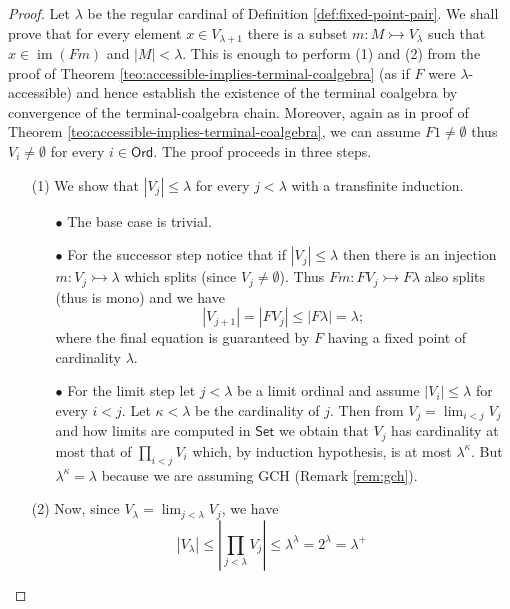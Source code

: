 \documentclass[letterpaper, 11pt, oneside]{memoir}
\theoremstyle{myteo}
\numberwithin{equation}{section}
\newcommand{\Ord}{\textsf{Ord}}
\newcommand{\Set}{\textsf{Set}}
\DeclareMathOperator{\im}{im}
\begin{document}
\begin{proof}
  Let \(\lambda\) be the regular cardinal of Definition \ref{def:fixed-point-pair}.
  We shall prove that for every element \(x \in V_{\lambda + 1}\) there is a subset \(m : M \rightarrowtail V_\lambda\) such that \(x \in \im(Fm)\) and \(|M| < \lambda\).
  This is enough to perform (1) and (2) from the proof of Theorem \ref{teo:accessible-implies-terminal-coalgebra} (as if \(F\) were \(\lambda\)-accessible) and hence establish the existence of the terminal coalgebra by convergence of the terminal-coalgebra chain.
  Moreover, again as in proof of Theorem \ref{teo:accessible-implies-terminal-coalgebra}, we can assume \(F1 \neq \emptyset\) thus \(V_i \neq \emptyset\) for every \(i \in \Ord\).
  The proof proceeds in three steps.
  \begin{itemize}
  \item[(1)]
    We show that \(|V_j| \leq \lambda\) for every \(j < \lambda\) with a transfinite induction.
    \begin{itemize}
    \item[\(\bullet\)] The base case is trivial.
    \item[\(\bullet\)] For the successor step notice  that if \(|V_j| \leq \lambda\) then there is an injection \(m : V_j \rightarrowtail \lambda\) which splits (since \(V_j \neq \emptyset\)).
      Thus \(Fm : FV_j \rightarrowtail F\lambda\) also splits (thus is mono) and we have
      \begin{equation*}
        |V_{j + 1}| = |FV_j| \leq |F\lambda| =\lambda;
      \end{equation*}
      where the final equation is guaranteed by \(F\) having a fixed point of cardinality \(\lambda\).
    \item[\(\bullet\)] For the limit step let \(j < \lambda\) be a limit ordinal and assume \(|V_i| \leq \lambda\) for every \(i < j\).
      Let \(\kappa < \lambda\) be the cardinality of \(j\).
      Then from \(V_j = \lim_{i < j}V_j\) and how limits are computed in \(\Set\) we obtain that \(V_j\) has cardinality at most that of \(\prod_{i < j}V_i\) which, by induction hypothesis, is at most \(\lambda^\kappa\).
      But \(\lambda^\kappa = \lambda\) because we are assuming GCH (Remark \ref{rem:gch}).
    \end{itemize}
  \item[(2)]
    Now, since \(V_\lambda = \lim_{j < \lambda}V_j\), we have
    \begin{equation*}
      |V_\lambda| \leq |\prod_{j < \lambda} V_j| \leq \lambda^\lambda = 2^\lambda = \lambda^+

\end{equation*}
\end{itemize}
\end{proof}
\end{document}
